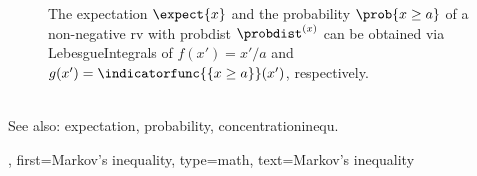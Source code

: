 {{\begin{figure}
            \caption{The \gls{expectation} $\expect\{x\}$ and the \gls{probability} $\prob{x \geq a}$ 
			    of a non-negative \gls{rv} with \gls{probdist} $\probdist^{(x)}$ 
				can be obtained via \glspl{LebesgueIntegral} of 
				$f(x') = x'/a$ and $g(x') = \indicatorfunc{\{x \geq a\}}(x')$, respectively.}
            \label{fig:markovsinequality_dict}
        \end{figure} \\
		See also: \gls{expectation}, \gls{probability}, \gls{concentrationinequ}.},
    first={Markov's inequality},
	type=math, 
    text={Markov's inequality}  
}


